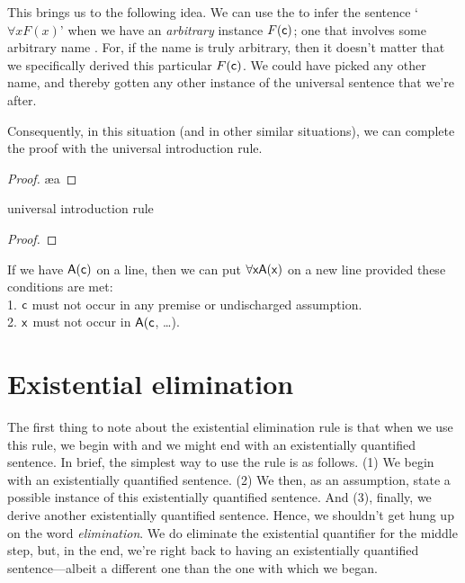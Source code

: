 This brings us to the following idea. We can use the  to infer the sentence `$\forall x F(x)$' when we have an \emph{arbitrary} instance $F(\mathsf{c})$; one that involves some arbitrary name .  For, if the name  is truly arbitrary, then it doesn't matter that we specifically derived this particular $F(\mathsf{c})$. We could have picked any other name, and thereby gotten any other instance of the universal sentence that we're after.

Consequently, in this situation (and in other similar situations), we can complete the proof with the universal introduction rule.

\begin{proof}
	 \pr{}
	 
	 \ae{a}
	 
\end{proof}

\begin{factboxy}{universal introduction rule}
\begin{proof}
	 
\end{proof}

\small{If we have $\mathsf{A(c)}$ on a line, then we can put $\forall \mathsf{xA(x)}$ on a new line provided these conditions are met:\\
1. $\mathsf{c}$ must not occur in any premise or undischarged assumption.\\
2. $\mathsf{x}$ must not occur in $\mathsf{A(c}$, \ldots).
}
\end{factboxy}


\section{Existential elimination}

The first thing to note about the existential elimination rule is that when we use this rule, we begin with and we might end with an existentially quantified sentence. In brief, the simplest way to use the rule is as follows. (1) We begin with an existentially quantified sentence. (2) We then, as an assumption, state a possible instance of this existentially quantified sentence. And (3), finally, we derive another existentially quantified sentence. Hence, we shouldn't get hung up on the word \textit{elimination}. We do eliminate the existential quantifier for the middle step, but, in the end, we're right back to having an existentially quantified sentence---albeit a different one than the one with which we began.

